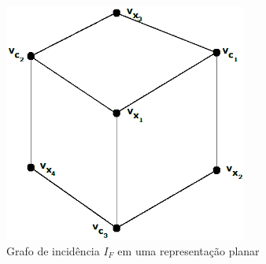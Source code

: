 \begin{figure}[htb]	
\center%
\includegraphics[width=8cm]{./img/grafoIncidencia2apexPlanar.png}
\caption{Grafo de incidência $I_F$ em uma representação planar }
\label{fig:grafoIncidencia2apexPlanar}
\end{figure}